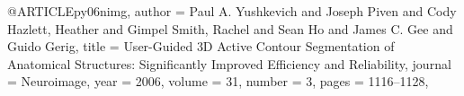@ARTICLE{py06nimg,
	author = {Paul A. Yushkevich and Joseph Piven and Cody Hazlett, Heather and
		Gimpel Smith, Rachel and Sean Ho and James C. Gee and Guido Gerig},
	title = {User-Guided {3D} Active Contour Segmentation of
		Anatomical Structures: Significantly Improved Efficiency and Reliability},
	journal = {Neuroimage},
	year = {2006},
	volume = {31},
	number = {3},
	pages = {1116--1128},
}